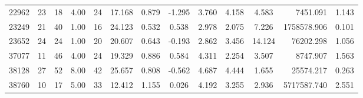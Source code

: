 \documentclass[mnsc]{informs3}
\begin{document}
\begin{APPENDICES}
\begin{longtable}{cccccccccccrc}
22962 & 23 & 18 & 4.00 & 24 & 17.168 & 0.879 & -1.295 & 3.760 & 4.158 & 4.583 & 7451.091 & 1.143 \\
23249 & 21 & 40 & 1.00 & 16 & 24.123 & 0.532 & 0.538 & 2.978 & 2.075 & 7.226 & 1758578.906 & 0.101 \\
23652 & 24 & 24 & 1.00 & 20 & 20.607 & 0.643 & -0.193 & 2.862 & 3.456 & 14.124 & 76202.298 & 1.056 \\
37077 & 11 & 46 & 4.00 & 24 & 19.329 & 0.886 & 0.584 & 4.311 & 2.254 & 3.507 & 8747.907 & 1.563 \\
38128 & 27 & 52 & 8.00 & 42 & 25.657 & 0.808 & -0.562 & 4.687 & 4.444 & 1.655 & 25574.217 & 0.263 \\
38760 & 10 & 17 & 5.00 & 33 & 12.412 & 1.155 & 0.026 & 4.192 & 3.255 & 2.936 & 5717587.740 & 2.551 \\
\bottomrule
\end{longtable}

\end{APPENDICES}










%



\end{document}

